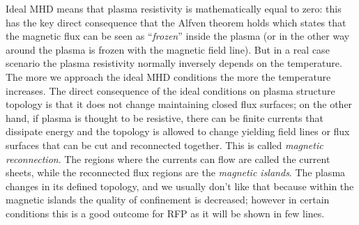 Ideal MHD means that plasma resistivity is mathematically equal to zero: this has the key direct consequence that the Alfven theorem holds which states that the magnetic flux can be seen as ``\textit{frozen}'' inside the plasma (or in the other way around the plasma is frozen with the magnetic field line).
But in a real case scenario the plasma resistivity normally inversely depends on the temperature. The more we approach the ideal MHD conditions the more the temperature increases. The direct consequence of the ideal conditions on plasma structure topology is that it does not change maintaining closed flux surfaces; on the other hand, if plasma is thought to be resistive, there can be finite currents that dissipate energy and the topology is allowed to change yielding field lines or flux surfaces that can be cut and reconnected together. This is called \textit{magnetic reconnection}. The regions where the currents can flow are called the current sheets, while the reconnected flux regions are the \textit{magnetic islands}. The plasma changes in its defined topology, and we usually don't like that because within the magnetic islands the quality of confinement is decreased; however in certain conditions this is a good outcome for RFP as it will be shown in few lines.

